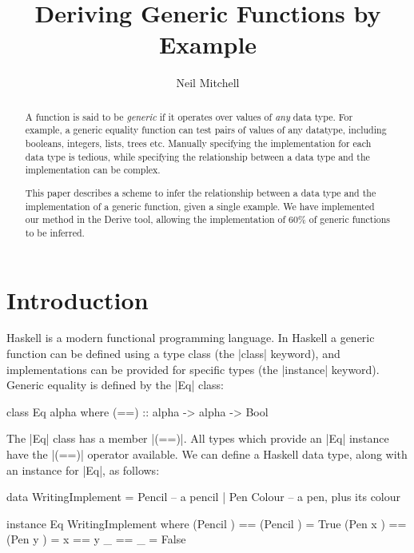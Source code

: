 \documentclass{llncs}
\begin{document}
\title{Deriving Generic Functions by Example}
\author{Neil Mitchell}


\maketitle

\begin{abstract}
A function is said to be \textit{generic} if it operates over values of \textit{any} data type. For example, a generic equality function can test pairs of values of any datatype, including booleans, integers, lists, trees etc. Manually specifying the implementation for each data type is tedious, while specifying the relationship between a data type and the implementation can be complex.

This paper describes a scheme to infer the relationship between a data type and the implementation of a generic function, given a single example. We have implemented our method in the Derive tool, allowing the implementation of 60\% of generic functions to be inferred.
\end{abstract}

\section{Introduction}

Haskell \cite{haskell} is a modern functional programming language. In Haskell a generic function can be defined using a type class \cite{wadler:type_classes} (the |class| keyword), and implementations can be provided for specific types (the |instance| keyword). Generic equality is defined by the |Eq| class:

\begin{code}
class Eq alpha where
    (==) :: alpha -> alpha -> Bool
\end{code}

The |Eq| class has a member |(==)|. All types which provide an |Eq| instance have the |(==)| operator available. We can define a Haskell data type, along with an instance for |Eq|, as follows:

\begin{code}
data WritingImplement  =  Pencil       -- a pencil
                       |  Pen Colour   -- a pen, plus its colour

instance Eq WritingImplement where
    (Pencil     )  == (Pencil     )  = True
    (Pen     x  )  == (Pen     y  )  = x == y
    _              == _              = False
\end{code}
\end{document}

